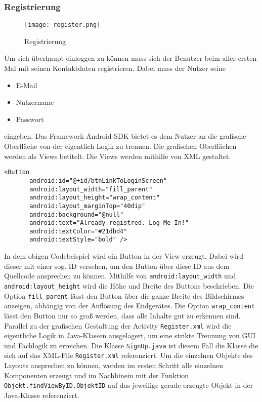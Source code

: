 \subsubsection{Registrierung}
\begin{figure}[h]
  \begin{center}
    \texttt{[image: register.png]}
  		  \caption{Registrierung}
     \label{fig.Prozess}
  \end{center}
\end{figure}

Um sich überhaupt einloggen zu können muss sich der Benutzer beim aller ersten Mal  mit seinen Kontaktdaten registrieren. Dabei muss der Nutzer seine 
\begin{itemize}
	\item{E-Mail}
	\item{Nutzername}
	\item{Passwort}
\end{itemize}
eingeben.
Das Framework Android-SDK bietet es dem Nutzer an die grafische Oberfläche von der eigentlich Logik zu trennen. Die grafischen Oberflächen werden als Views betitelt. Die Views werden mithilfe von XML gestaltet.
\begin{lstlisting}[caption={Android - Button erstellen},captionpos=b]
<Button
       android:id="@+id/btnLinkToLoginScreen"
       android:layout_width="fill_parent"
       android:layout_height="wrap_content"
       android:layout_marginTop="40dip"
       android:background="@null"
       android:text="Already registred. Log Me In!"
       android:textColor="#21dbd4"
       android:textStyle="bold" />
\end{lstlisting}
In dem obigen Codebeispiel wird ein Button in der View erzeugt. Dabei wird dieser mit einer sog. ID versehen, um den Button über diese ID aus dem Quellcode ansprechen zu können. Mithilfe von \texttt{android:layout\_width} und \texttt{android:layout\_height} wird die Höhe und Breite des Buttons beschrieben. Die Option \texttt{fill\_parent} lässt den Button über die ganze Breite des Bildschirmes anzeigen, abhängig von der Auflösung des Endgerätes. Die Option \texttt{wrap\_content} lässt den Button nur so groß werden, dass alle Inhalte gut zu erkennen sind.
\\
Parallel zu der grafischen Gestaltung der Activity \texttt{Register.xml} wird die eigentliche Logik in Java-Klassen ausgelagert, um eine strikte Trennung von GUI und Fachlogik zu erreichen. Die Klasse \texttt{SignUp.java} ist diesem Fall die Klasse die sich auf das XML-File \texttt{Register.xml} referenziert. Um die einzelnen Objekte des Layouts ansprechen zu können, werden im ersten Schritt alle einzelnen Komponenten erzeugt und im Nachhinein mit der Funktion \texttt{Objekt.findViewByID.ObjektID} auf das jeweilige gerade erzeugte Objekt in der Java-Klasse referenziert.
